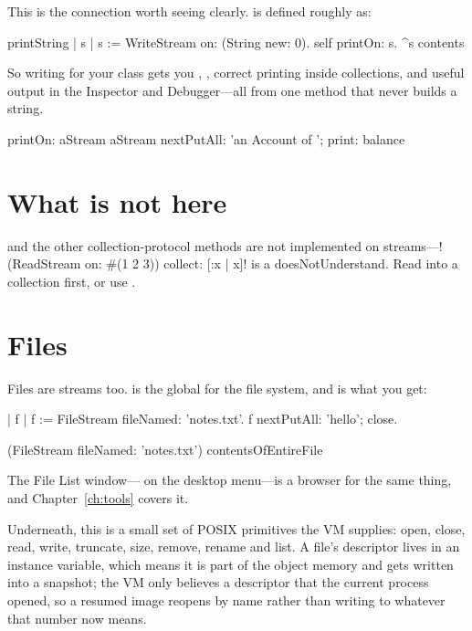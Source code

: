 This is the connection worth seeing clearly.  is defined
roughly as:

\begin{st}
printString
    | s |
    s := WriteStream on: (String new: 0).
    self printOn: s.
    ^s contents
\end{st}

So writing  for your class gets you ,
, correct printing inside collections, and useful output in
the Inspector and Debugger---all from one method that never builds a string.

\begin{st}
printOn: aStream
    aStream nextPutAll: 'an Account of '; print: balance
\end{st}

\section{What is not here}

 and the other collection-protocol methods are not
implemented on streams---\ct!(ReadStream on: #(1 2 3)) collect: [:x | x]! is
a doesNotUnderstand. Read into a collection first, or use .

\section{Files}

Files are streams too.  is the global for the file system, and
 is what you get:

\begin{st}
| f |
f := FileStream fileNamed: 'notes.txt'.
f nextPutAll: 'hello'; close.

(FileStream fileNamed: 'notes.txt') contentsOfEntireFile
\end{st}

The File List window--- on the desktop menu---is a browser for
the same thing, and Chapter~\ref{ch:tools} covers it.

Underneath, this is a small set of POSIX primitives the VM supplies: open,
close, read, write, truncate, size, remove, rename and list. A file's
descriptor lives in an instance variable, which means it is part of the object
memory and gets written into a snapshot; the VM only believes a descriptor
that the current process opened, so a resumed image reopens by name rather
than writing to whatever that number now means.

